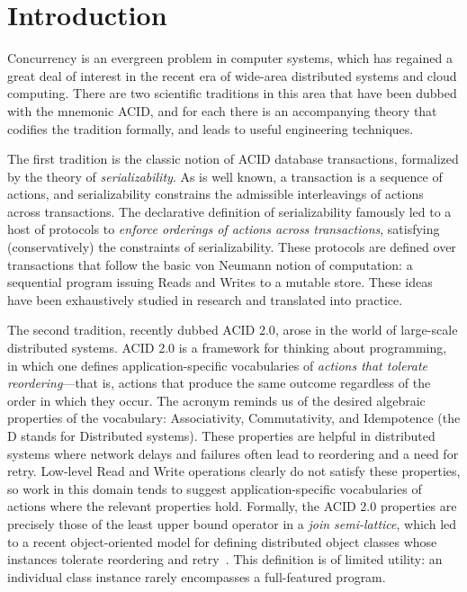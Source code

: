 \documentclass{sig-alternate}
\begin{document}
\section{Introduction}
Concurrency is an evergreen problem in computer systems, which has regained a
great deal of interest in the recent era of wide-area distributed systems and
cloud computing.  There are two scientific traditions in this area that have
been dubbed with the mnemonic \textsf{ACID}, and for each there is an
accompanying theory that codifies the tradition formally, and leads to useful
engineering techniques.

The first tradition is the classic notion of \textsf{ACID} database
transactions, formalized by the theory of \emph{serializability}.  As is well
known, a transaction is a sequence of actions, and serializability constrains
the admissible interleavings of actions across transactions.  The declarative
definition of serializability famously led to a host of protocols to
\emph{enforce orderings of actions across transactions}, satisfying
(conservatively) the constraints of serializability.  These protocols are
defined over transactions that follow the basic von Neumann notion of
computation: a sequential program issuing Reads and Writes to a mutable store.
These ideas have been exhaustively studied in research and translated into
practice.

The second tradition, recently dubbed \textsf{ACID 2.0}, arose in the world of
large-scale distributed systems.  ACID 2.0 is a framework for thinking about
programming, in which one defines application-specific vocabularies of
\emph{actions that tolerate reordering}---that is, actions that produce the same
outcome regardless of the order in which they occur.  The acronym reminds us of
the desired algebraic properties of the vocabulary: Associativity,
Commutativity, and Idempotence (the D stands for Distributed systems).  These
properties are helpful in distributed systems where network delays and failures
often lead to reordering and a need for retry. Low-level Read and Write
operations clearly do not satisfy these properties, so work in this domain tends
to suggest application-specific vocabularies of actions where the relevant
properties hold.  Formally, the ACID 2.0 properties are precisely those of the
least upper bound operator in a {\em join semi-lattice}, which led to a recent
object-oriented model for defining distributed object classes whose instances
tolerate reordering and retry~\cite{Shapiro2011a,Shapiro2011b}.  This definition is of limited
utility: an individual class instance rarely encompasses a full-featured
program.
\end{document}
